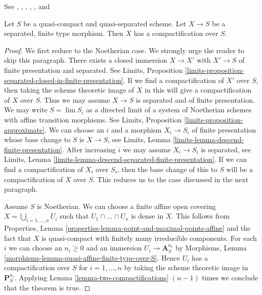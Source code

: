 \begin{theorem}
\label{theorem-nagata}
\begin{reference}
See \cite{Lutkebohmert}, \cite{Conrad-Nagata}, \cite{Nagata-1},
\cite{Nagata-2}, \cite{Nagata-3}, and \cite{Nagata-4}
\end{reference}
Let $S$ be a quasi-compact and quasi-separated scheme. Let
$X \to S$ be a separated, finite type morphism.
Then $X$ has a compactification over $S$.
\end{theorem}

\begin{proof}
We first reduce to the Noetherian case. We strongly urge the reader
to skip this paragraph. There exists a closed immersion
$X \to X'$ with $X' \to S$ of finite presentation and separated.
See Limits, Proposition
\ref{limits-proposition-separated-closed-in-finite-presentation}.
If we find a compactification of $X'$ over $S$, then
taking the scheme theoretic image of $X$ in this will give
a compactification of $X$ over $S$. Thus we may assume
$X \to S$ is separated and of finite presentation.
We may write $S = \lim S_i$ as a directed
limit of a system of Noetherian schemes with affine transition morphisms.
See Limits, Proposition \ref{limits-proposition-approximate}.
We can choose an $i$ and a morphism $X_i \to S_i$ of finite
presentation whose base change to $S$ is $X \to S$, see
Limits, Lemma \ref{limits-lemma-descend-finite-presentation}.
After increasing $i$ we may assume $X_i \to S_i$ is separated, see
Limits, Lemma \ref{limits-lemma-descend-separated-finite-presentation}.
If we can find a compactification of $X_i$ over $S_i$, then the
base change of this to $S$ will be a compactification of $X$ over $S$.
This reduces us to the case discussed in the next paragraph.

\medskip\noindent
Assume $S$ is Noetherian. We can choose a finite affine open covering
$X = \bigcup_{i = 1, \ldots, n} U_i$ such that $U_1 \cap \ldots \cap U_n$
is dense in $X$. This follows from
Properties, Lemma \ref{properties-lemma-point-and-maximal-points-affine}
and the fact that $X$ is quasi-compact with finitely many
irreducible components. For each $i$ we can choose an $n_i \geq 0$ and an
immersion $U_i \to \mathbf{A}^{n_i}_S$ by
Morphisms, Lemma \ref{morphisms-lemma-quasi-affine-finite-type-over-S}.
Hence $U_i$ has a compactification over $S$ for $i = 1, \ldots, n$
by taking the scheme theoretic image in $\mathbf{P}^{n_i}_S$.
Applying Lemma \ref{lemma-two-compactifications}
$(n - 1)$ times we conclude that the theorem is true.
\end{proof}
